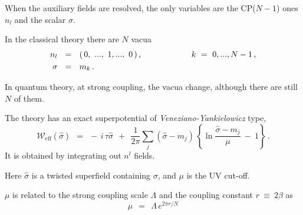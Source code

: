 \documentclass[12pt,letterpaper,landscape,KOMA,smallheadings,calcdimensions,display]{powersem}
\newcommand{\W}{\mathcal{W}}
\newcommand{\hsigma}{{\hat{\sigma}}}
\begin{document}
\begin{slide}
\vspace*{1.5cm}

	When the auxiliary fields are resolved, the only variables are the CP($N-1$) 
	ones $ n_l $ and the scalar $ \sigma $.

	In the classical theory there are $ N $ vacua
\begin{align*}
%
	n_l & ~~=~~ (\, 0,~ ...,~ 1, ...,~ 0\, )\,,  	\qquad\qquad\qquad  k ~=~ 0,..., N-1\,,
\notag
	\\
%
	\sigma & ~~=~~ m_k \,.
\label{nvacua}
\end{align*}

	In quantum theory, at strong coupling, the vacua change, although there are
	still $ N $ of them.

\end{slide}


\begin{slide}
\vspace*{1cm}

	The theory has an exact superpotential of \emph{Veneziano-Yankielowicz} type,
\[
	\W_\text{eff}(\hsigma) ~~=~~
		-\, i\, \tau \hsigma ~~+~~
		\frac{1}{2\pi} \sum_j (\hsigma - m_j)\, 
				      \left\{ \ln {\frac{\hsigma - m_j}{\mu}} ~-~ 1 \right\}\,\text{.}
\]
	It is obtained by integrating out $ n^l $ fields.

	Here $ \hsigma $ is a twisted superfield containing $ \sigma $, and $ \mu $ is the UV cut-off.

	$ \mu $ is related to the strong coupling scale $ \Lambda $ and the coupling constant $ r ~\equiv~ 2\beta $ as
\[
	\mu ~~=~~ \Lambda\, e^{2\pi r/N}
\]
\end{slide}
\end{document}

